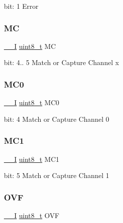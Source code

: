 bit\+: 1 Error \mbox{\label{union_t_c___i_n_t_f_l_a_g___type_a8cea78f0033c16a73b18246c8c72ac78}} 
\subsubsection{\texorpdfstring{MC}{MC}}
{\footnotesize\ttfamily \mbox{\hyperlink{core__cm0plus_8h_af63697ed9952cc71e1225efe205f6cd3}{\+\_\+\+\_\+I}} \mbox{\hyperlink{union_t_c___i_n_t_f_l_a_g___type_a5b4208c6f4c4a4290c4f2804d1eb1d5b}{uint8\+\_\+t}} MC}

bit\+: 4.. 5 Match or Capture Channel x \mbox{\label{union_t_c___i_n_t_f_l_a_g___type_a0c40f9589c09a7eeb732fbb9f537cda9}} 
\subsubsection{\texorpdfstring{MC0}{MC0}}
{\footnotesize\ttfamily \mbox{\hyperlink{core__cm0plus_8h_af63697ed9952cc71e1225efe205f6cd3}{\+\_\+\+\_\+I}} \mbox{\hyperlink{union_t_c___i_n_t_f_l_a_g___type_a5b4208c6f4c4a4290c4f2804d1eb1d5b}{uint8\+\_\+t}} M\+C0}

bit\+: 4 Match or Capture Channel 0 \mbox{\label{union_t_c___i_n_t_f_l_a_g___type_aa3b7f1787322948d34ddb5abe8e35609}} 
\subsubsection{\texorpdfstring{MC1}{MC1}}
{\footnotesize\ttfamily \mbox{\hyperlink{core__cm0plus_8h_af63697ed9952cc71e1225efe205f6cd3}{\+\_\+\+\_\+I}} \mbox{\hyperlink{union_t_c___i_n_t_f_l_a_g___type_a5b4208c6f4c4a4290c4f2804d1eb1d5b}{uint8\+\_\+t}} M\+C1}

bit\+: 5 Match or Capture Channel 1 \mbox{\label{union_t_c___i_n_t_f_l_a_g___type_a52c588fc013d003e33ea581b20d4ba73}} 
\subsubsection{\texorpdfstring{OVF}{OVF}}
{\footnotesize\ttfamily \mbox{\hyperlink{core__cm0plus_8h_af63697ed9952cc71e1225efe205f6cd3}{\+\_\+\+\_\+I}} \mbox{\hyperlink{union_t_c___i_n_t_f_l_a_g___type_a5b4208c6f4c4a4290c4f2804d1eb1d5b}{uint8\+\_\+t}} O\+VF}

